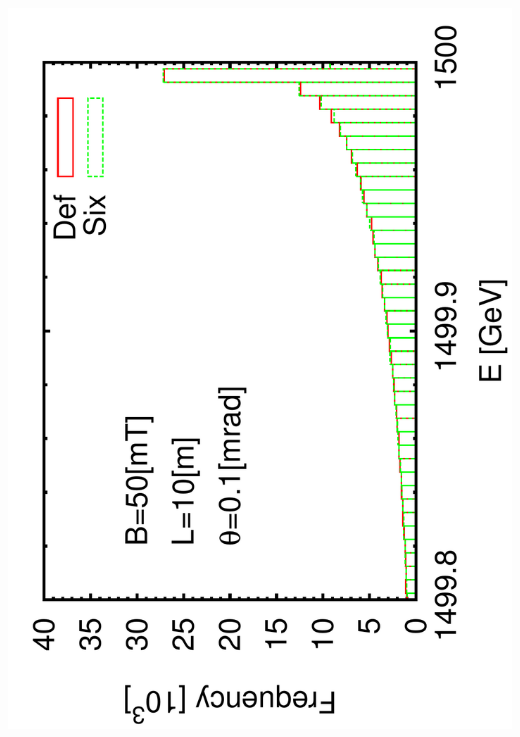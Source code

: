 \documentclass{beamer}
\begin{document}
\begin{frame}
  \includegraphics[scale=0.24,angle=-90]{histogram1e-4.pdf}

\end{frame}
\end{document}
